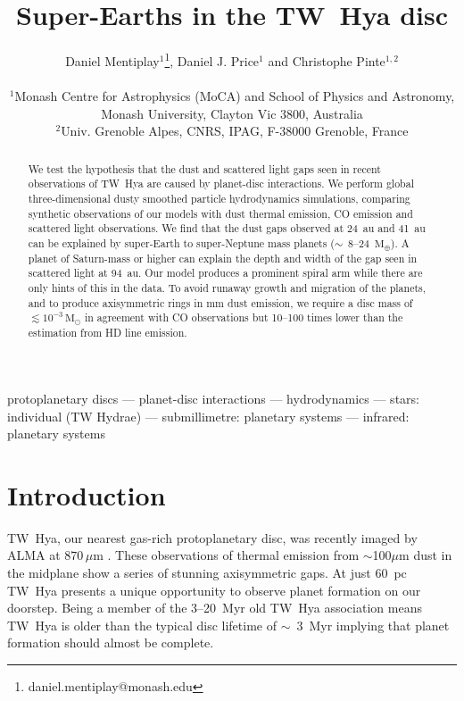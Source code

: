 \documentclass[usenatbib,a4paper,times]{mnras}
\title[Super-Earths in TW~Hya]{Super-Earths in the TW~Hya disc}
\author[Mentiplay, Price \& Pinte]{\parbox{\textwidth}{Daniel
   Mentiplay$^{1}$\thanks{daniel.mentiplay@monash.edu}, Daniel J. Price$^{1}$
   and Christophe Pinte$^{1,2}$}\\
   $^{1}$Monash Centre for Astrophysics (MoCA) and School of Physics and
   Astronomy, Monash University, Clayton Vic 3800, Australia \\
$^{2}$Univ. Grenoble Alpes, CNRS, IPAG, F-38000 Grenoble, France}
\date{}
\renewcommand{\sun}{\mathrm{M}_{\odot}}
\renewcommand{\earth}{\mathrm{M}_{\oplus}}
\begin{document}
\label{firstpage}

\maketitle


\begin{abstract}

We test the hypothesis that the dust and scattered light gaps seen in recent
observations of TW~Hya are caused by planet-disc interactions. We perform global
three-dimensional dusty smoothed particle hydrodynamics simulations, comparing
synthetic observations of our models with dust thermal emission, CO emission and
scattered light observations. We find that the dust gaps observed at 24~au and
41~au can be explained by super-Earth to super-Neptune mass planets
($\sim$~8--24~$\earth{}$). A planet of Saturn-mass or higher can explain the
depth and width of the gap seen in scattered light at 94~au. Our model produces
a prominent spiral arm while there are only hints of this in the data. To
avoid runaway growth and migration of the planets, and to produce axisymmetric
rings in mm dust emission, we require a disc mass of $\lesssim 10^{-3}\,\sun{}$
in agreement with CO observations but 10--100 times lower than the estimation
from HD line emission.

\end{abstract}



\begin{keywords}
protoplanetary discs --- planet-disc interactions --- hydrodynamics ---  stars:
individual (TW Hydrae) --- submillimetre: planetary systems --- infrared:
planetary systems %
\end{keywords}










\section{Introduction}

TW~Hya, our nearest gas-rich protoplanetary disc, was recently imaged by ALMA at
$870\,\mu$m \citep{andrews:2016}. These observations of thermal emission from
$\sim$100$\mu$m dust in the midplane show a series of stunning axisymmetric
gaps. At just $60$~pc \citep{gaia-collaboration:2018} TW~Hya presents a unique
opportunity to observe planet formation on our doorstep. Being a member of the
3--20~Myr old \citep{barrado-y-navascues:2006} TW~Hya association means TW~Hya
is older than the typical disc lifetime of $\sim$~3~Myr \citep{haisch:2001}
implying that planet formation should almost be complete.
\end{document}

